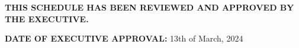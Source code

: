\textbf{THIS SCHEDULE HAS BEEN REVIEWED AND APPROVED BY THE EXECUTIVE.}

\vspace{0.5cm}
\textbf{DATE OF EXECUTIVE APPROVAL:} 13th of March, 2024

